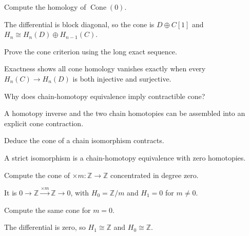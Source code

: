 \begin{problem}\label{prob:viii24-03}
Compute the homology of \(\operatorname{Cone}(0)\).
\end{problem}
\begin{solution}
The differential is block diagonal, so the cone is \(D\oplus C[1]\) and \(H_n\cong H_n(D)\oplus H_{n-1}(C)\).
\end{solution}

\begin{problem}\label{prob:viii24-04}
Prove the cone criterion using the long exact sequence.
\end{problem}
\begin{solution}
Exactness shows all cone homology vanishes exactly when every \(H_n(C)\to H_n(D)\) is both injective and surjective.
\end{solution}

\begin{problem}\label{prob:viii24-05}
Why does chain-homotopy equivalence imply contractible cone?
\end{problem}
\begin{solution}
A homotopy inverse and the two chain homotopies can be assembled into an explicit cone contraction.
\end{solution}

\begin{problem}\label{prob:viii24-06}
Deduce the cone of a chain isomorphism contracts.
\end{problem}
\begin{solution}
A strict isomorphism is a chain-homotopy equivalence with zero homotopies.
\end{solution}

\begin{problem}[Multiplication by \(m\)]\label{prob:viii24-07}
Compute the cone of \(\times m:\mathbb Z\to\mathbb Z\) concentrated in degree zero.
\end{problem}
\begin{solution}
It is \(0\to\mathbb Z\xrightarrow{\times m}\mathbb Z\to0\), with \(H_0=\mathbb Z/m\) and \(H_1=0\) for \(m\ne0\).
\end{solution}

\begin{problem}[Case \(m=0\)]\label{prob:viii24-08}
Compute the same cone for \(m=0\).
\end{problem}
\begin{solution}
The differential is zero, so \(H_1\cong\mathbb Z\) and \(H_0\cong\mathbb Z\).
\end{solution}

